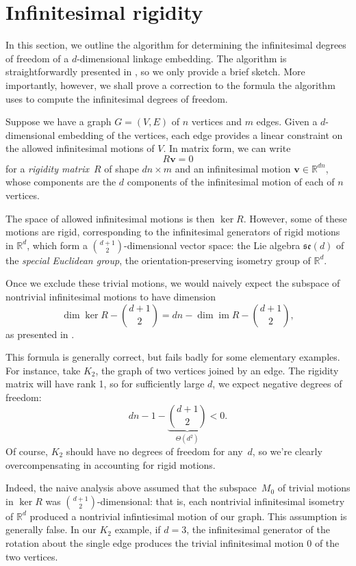 \documentclass[aps,prd,final,twocolumn,letterpaper,nofootinbib]{revtex4-1}
\newcommand\RR{\mathbb{R}}
\DeclareMathOperator\im{im}
\newcommand{\mb}{\mathbf}
\begin{document}
\section{Infinitesimal rigidity}
\label{sec:infrigid}

In this section,
we outline the algorithm for determining the infinitesimal degrees of freedom
of a $d$-dimensional linkage embedding.
The algorithm is straightforwardly presented in \cite[\S4.4.2]{gfalop},
so we only provide a brief sketch.
More importantly, however,
we shall prove a correction to the formula the algorithm uses
to compute the infinitesimal degrees of freedom.

Suppose we have a graph $G = (V, E)$ of $n$ vertices and $m$ edges.
Given a $d$-dimensional embedding of the vertices,
each edge provides a linear constraint
on the allowed infinitesimal motions of $V$.
In matrix form, we can write
\begin{equation}
    R\mb v = 0
\end{equation}
for a \emph{rigidity matrix}~$R$ of shape $dn \times m$
and an infinitesimal motion $\mb v \in \RR^{dn}$,
whose components are the $d$ components
of the infinitesimal motion of each of $n$ vertices.

The space of allowed infinitesimal motions is then $\ker R$.
However, some of these motions are rigid,
corresponding to the infinitesimal generators of rigid motions in $\RR^d$,
which form a $\binom{d+1}{2}$-dimensional vector space:
the Lie algebra $\mathfrak{se}(d)$ of the \emph{special Euclidean group},
the orientation-preserving isometry group of $\RR^d$.

Once we exclude these trivial motions,
we would naively expect the subspace of nontrivial infinitesimal motions
to have dimension
\begin{equation}\label{eq:wrong-infdof}
    \dim\ker R - \binom{d+1}{2} = dn - \dim\im R - \binom{d+1}{2},
\end{equation}
as presented in \cite{gfalop}.

This formula is generally correct,
but fails badly for some elementary examples.
For instance, take $K_2$, the graph of two vertices joined by an edge.
The rigidity matrix will have rank 1,
so for sufficiently large $d$,
we expect negative degrees of freedom:
\[
    dn - 1 - \underbrace{\binom{d+1}{2}}_{\Theta(d^2)} < 0.
\]
Of course, $K_2$ should have no degrees of freedom for any~$d$,
so we're clearly overcompensating in accounting for rigid motions.

Indeed, the naive analysis above
assumed that the subspace~$M_0$ of trivial motions in $\ker R$
was $\binom{d+1}{2}$-dimensional:
that is, each nontrivial infinitesimal isometry of $\RR^d$
produced a nontrivial infintiesimal motion of our graph.
This assumption is generally false.
In our $K_2$ example,
if $d=3$, 
the infinitesimal generator
of the rotation about the single edge
produces the trivial infinitesimal motion 0
of the two vertices.
\end{document}
